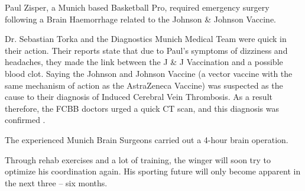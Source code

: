 Paul Zisper, a Munich based Basketball Pro, required emergency surgery following
a Brain Haemorrhage related to the Johnson \& Johnson Vaccine.

Dr. Sebastian Torka and the Diagnostics Munich Medical Team were quick in their
action. Their reports state that due to Paul’s symptoms of dizziness and
headaches, they made the link between the J \& J Vaccination and a possible blood
clot. Saying the Johnson and Johnson Vaccine (a vector vaccine with the same
mechanism of action as the AstraZeneca Vaccine) was suspected as the cause to
their diagnosis of Induced Cerebral Vein Thrombosis. As a result therefore, the
FCBB doctors urged a quick CT scan, and this diagnosis was confirmed .

The experienced Munich Brain Surgeons carried out a 4-hour brain operation.

Through rehab exercises and a lot of training, the winger will soon try to
optimize his coordination again. His sporting future will only become apparent
in the next three – six months.
  
